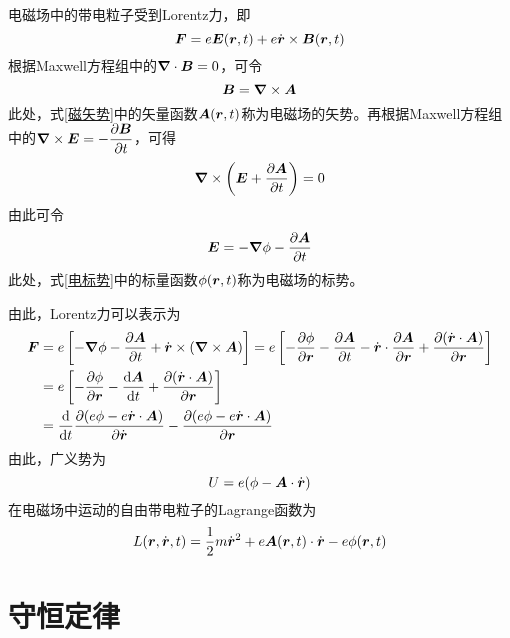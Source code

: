 电磁场中的带电粒子受到Lorentz力，即
\begin{equation}
	\boldsymbol{F} = e\boldsymbol{E}(\boldsymbol{r},t) + e\dot{\boldsymbol{r}} \times \boldsymbol{B}(\boldsymbol{r},t)
\end{equation}
根据Maxwell方程组中的$\boldsymbol{\nabla} \cdot \boldsymbol{B} = 0$，可令
\begin{equation}
	\boldsymbol{B} = \boldsymbol{\nabla} \times \boldsymbol{A}
	\label{磁矢势}
\end{equation}
此处，式\eqref{磁矢势}中的矢量函数$\boldsymbol{A}(\boldsymbol{r},t)$称为{\heiti 电磁场的矢势}。再根据Maxwell方程组中的$\displaystyle \boldsymbol{\nabla} \times \boldsymbol{E} = -\frac{\partial \boldsymbol{B}}{\partial t}$，可得
\begin{equation*}
	\boldsymbol{\nabla} \times \left(\boldsymbol{E} + \frac{\partial \boldsymbol{A}}{\partial t}\right) = 0
\end{equation*}
由此可令
\begin{equation}
	\boldsymbol{E} = -\boldsymbol{\nabla} \phi - \frac{\partial \boldsymbol{A}}{\partial t}
	\label{电标势}
\end{equation}
此处，式\eqref{电标势}中的标量函数$\phi(\boldsymbol{r},t)$称为{\heiti 电磁场的标势}。

由此，Lorentz力可以表示为
\begin{align}
	\boldsymbol{F} & = e\left[-\boldsymbol{\nabla} \phi - \frac{\partial \boldsymbol{A}}{\partial t} + \dot{\boldsymbol{r}} \times (\boldsymbol{\nabla} \times \boldsymbol{A})\right] = e\left[-\frac{\partial \phi}{\partial \boldsymbol{r}} - \frac{\partial \boldsymbol{A}}{\partial t} - \dot{\boldsymbol{r}} \cdot \frac{\partial \boldsymbol{A}}{\partial \boldsymbol{r}} + \frac{\partial (\dot{\boldsymbol{r}} \cdot \boldsymbol{A})}{\partial \boldsymbol{r}}\right] \nonumber \\
	& = e\left[-\frac{\partial \phi}{\partial \boldsymbol{r}} - \frac{\mathrm{d} \boldsymbol{A}}{\mathrm{d} t} + \frac{\partial (\dot{\boldsymbol{r}} \cdot \boldsymbol{A})}{\partial \boldsymbol{r}}\right] \nonumber \\
	& = \frac{\mathrm{d}}{\mathrm{d} t} \frac{\partial (e\phi - e\dot{\boldsymbol{r}}\cdot \boldsymbol{A})}{\partial \dot{\boldsymbol{r}}} - \frac{\partial (e\phi - e\dot{\boldsymbol{r}}\cdot \boldsymbol{A})}{\partial \boldsymbol{r}}
\end{align}
由此，广义势为
\begin{equation}
	U = e(\phi - \boldsymbol{A} \cdot \dot{\boldsymbol{r}})
	\label{电磁场中带电粒子的广义势}
\end{equation}
在电磁场中运动的自由带电粒子的Lagrange函数为
\begin{equation}
	L(\boldsymbol{r},\dot{\boldsymbol{r}},t) = \frac12 m \dot{\boldsymbol{r}}^2 + e\boldsymbol{A}(\boldsymbol{r},t) \cdot \dot{\boldsymbol{r}} - e\phi(\boldsymbol{r},t)
	\label{电磁场中点电粒子的Lagrange函数}
\end{equation}

\section{守恒定律}

